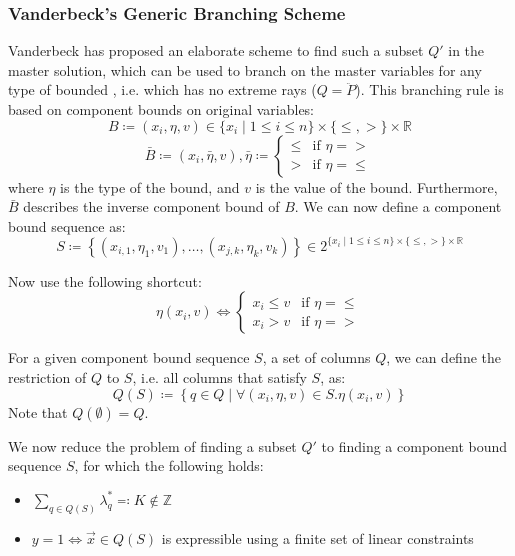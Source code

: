 \subsubsection{Vanderbeck's Generic Branching Scheme}\label{sec:cg_bp_bp_branching_generic}
Vanderbeck has proposed an elaborate scheme to find such a subset $Q'$ in the master solution, which can be used to branch on the master variables for any type of bounded \IP{}, i.e. which has no extreme rays ($Q = \ddot{P}$). This branching rule is based on component bounds on original variables:
\begin{equation}
B \coloneqq \left( x_i, \eta, v \right) \in \{x_i \mid 1 \leq i \leq n\} \times \{\leq, >\} \times \mathbb{R}
\end{equation}
\begin{equation}
\bar{B} \coloneqq \left( x_i, \bar{\eta}, v \right), \bar{\eta} \coloneqq \begin{cases} \leq & \text{if } \eta = > \\ > & \text{if } \eta = \leq \end{cases}
\end{equation}
where $\eta$ is the type of the bound, and $v$ is the value of the bound. Furthermore, $\bar{B}$ describes the inverse component bound of $B$. We can now define a component bound sequence as:
\begin{equation}
S \coloneqq \left\{ \left( x_{i,1}, \eta_1, v_1 \right), \dots, \left( x_{j,k}, \eta_k, v_k \right) \right\} \in 2^{\{x_i \mid 1 \leq i \leq n\} \times \{\leq, >\} \times \mathbb{R}}
\end{equation}

Now use the following shortcut:
\begin{equation}
\eta(x_i, v) \Leftrightarrow
\begin{cases}
x_i \leq v & \text{if } \eta = \leq \\
x_i > v & \text{if } \eta = >
\end{cases}
\end{equation}

For a given component bound sequence $S$, a set of columns $Q$, we can define the restriction of $Q$ to $S$, i.e. all columns that satisfy $S$, as:
\begin{equation}
Q(S) \coloneqq \left\{ q \in Q \mid \forall \left( x_i, \eta, v \right) \in S. \eta(x_i, v) \right\}
\end{equation}
Note that $Q(\emptyset) = Q$.

We now reduce the problem of finding a subset $Q'$ to finding a component bound sequence $S$, for which the following holds:
\begin{itemize}
\item $\sum_{q \in Q(S)} \lambda_q^* \eqqcolon K \not\in \mathbb{Z}$
\item $y = 1 \Leftrightarrow \vec{x} \in Q(S)$ is expressible using a finite set of linear constraints
\end{itemize}

